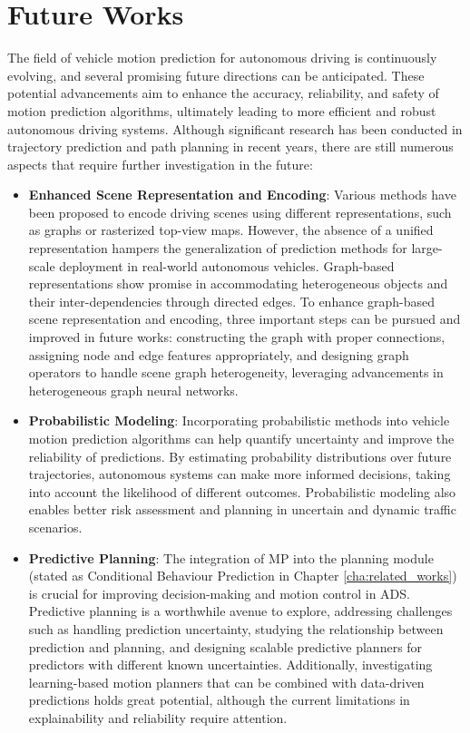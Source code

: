 \section{Future Works}
\label{sec:9_future_works}

The field of vehicle motion prediction for autonomous driving is continuously evolving, and several promising future directions can be anticipated. These potential advancements aim to enhance the accuracy, reliability, and safety of motion prediction algorithms, ultimately leading to more efficient and robust autonomous driving systems. Although significant research has been conducted in trajectory prediction and path planning in recent years, there are still numerous aspects that require further investigation in the future:

\begin{itemize}
	\item \textbf{Enhanced Scene Representation and Encoding}: Various methods have been proposed to encode driving scenes using different representations, such as graphs or rasterized top-view maps. However, the absence of a unified representation hampers the generalization of prediction methods for large-scale deployment in real-world autonomous vehicles. Graph-based representations show promise in accommodating heterogeneous objects and their inter-dependencies through directed edges. To enhance graph-based scene representation and encoding, three important steps can be pursued and improved in future works: constructing the graph with proper connections, assigning node and edge features appropriately, and designing graph operators to handle scene graph heterogeneity, leveraging advancements in heterogeneous graph neural networks. 

	\item \textbf{Probabilistic Modeling}: Incorporating probabilistic methods into vehicle motion prediction algorithms can help quantify uncertainty and improve the reliability of predictions. By estimating probability distributions over future trajectories, autonomous systems can make more informed decisions, taking into account the likelihood of different outcomes. Probabilistic modeling also enables better risk assessment and planning in uncertain and dynamic traffic scenarios.
	
	\item \textbf{Predictive Planning}: The integration of \ac{MP} into the planning module (stated as Conditional Behaviour Prediction in Chapter \ref{cha:related_works}) is crucial for improving decision-making and motion control in \ac{ADS}. Predictive planning is a worthwhile avenue to explore, addressing challenges such as handling prediction uncertainty, studying the relationship between prediction and planning, and designing scalable predictive planners for predictors with different known uncertainties. Additionally, investigating learning-based motion planners that can be combined with data-driven predictions holds great potential, although the current limitations in explainability and reliability require attention.
	

\end{itemize}
